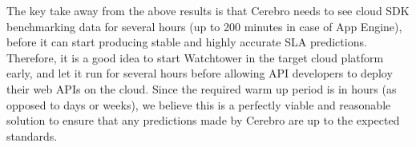 The key take away from the above results is that Cerebro needs to see cloud SDK benchmarking data 
for several hours (up to 200 minutes in case of 
App Engine), before it can start producing stable and highly accurate SLA predictions. Therefore, it is a good idea to start Watchtower in the
target cloud platform early, and let it run for several hours before allowing API developers to deploy their web APIs on the cloud. Since the
required warm up period is in hours (as opposed to days or weeks), we believe this is a perfectly viable and reasonable solution to
ensure that any predictions made by Cerebro are up to the expected standards. 
